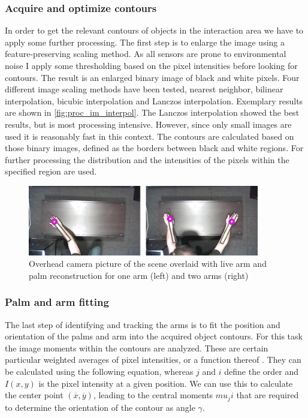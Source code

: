 \subsubsection{Acquire and optimize contours}
In order to get the relevant contours of objects in the interaction area we have to apply some further processing. The first step is to enlarge the image using a feature-preserving scaling method. As all sensors are prone to environmental noise I apply some thresholding based on the pixel intensities before looking for contours. The result is an enlarged binary image of black and white pixels. Four different image scaling methods have been tested, nearest neighbor, bilinear interpolation, bicubic interpolation and Lanczos interpolation. Exemplary results are shown in \ref{fig:proc_im_interpol}. The Lanczos interpolation showed the best results, but is most processing intensive. However, since only small images are used it is reasonably fast in this context. The contours are calculated based on those binary images, defined as the borders between black and white regions. For further processing the distribution and the intensities of the pixels within the specified region are used.
\begin{figure}[h]
\centering
\includegraphics[width=0.9\textwidth]{images/proc_im_arms}
\caption{Overhead camera picture of the scene overlaid with live arm and palm reconstruction for one arm (left) and two arms (right)}
\label{fig:proc_im_arms}
\end{figure}

\subsubsection{Palm and arm fitting}
The last step of identifying and tracking the arms is to fit the position and orientation of the palms and arm into the acquired object contours. For this task the image moments within the contours are analyzed. These are certain particular weighted averages of pixel intensities, or a function thereof \cite{hu1962visual}. They can be calculated using the following equation, whereas $j$ and $i$ define the order and $I(x,y)$ is the pixel intensity at a given position. We can use this to calculate the center point $(\overline{x},\overline{y})$, leading to the central moments $mu_ji$ that are required to determine the orientation of the contour as angle $\gamma$.

